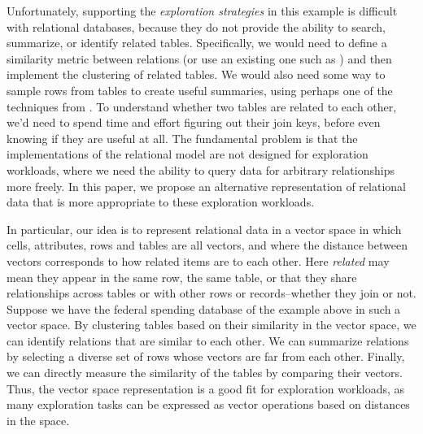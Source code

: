 Unfortunately, supporting the \emph{exploration strategies} in this example is
difficult with relational databases, because they do not provide the ability to
search, summarize, or identify related tables. Specifically, we would need to
define a similarity metric between relations (or use an existing one such as
\cite{summarydb}) and then implement the clustering of related tables. We would also
need some way to sample rows from tables to create useful summaries, using
perhaps one of the techniques from \cite{diversifydb}. To understand whether two
tables are related to each other, we'd need to spend time and effort figuring
out their join keys, before even knowing if they are useful at all. The
fundamental problem is that the implementations of the relational model are not
designed for exploration workloads, where we need the ability to query data for
arbitrary relationships more freely. In this paper, we propose an alternative
representation of relational data that is more appropriate to these exploration
workloads.

In particular, our idea is to represent relational data in a vector space in
which cells, attributes, rows and tables are all vectors, and where the distance
between vectors corresponds to how related items are to each other. Here {\it
related} may mean they appear in the same row, the same table, or that they
share relationships across tables or with other rows or records--whether they
join or not. Suppose we have the federal spending database of the example above
in such a vector space. By clustering tables based on their similarity in the
vector space, we can identify relations that are similar to each other. We can
summarize relations by selecting a diverse set of rows whose vectors are far
from each other. Finally, we can directly measure the similarity of the tables
by comparing their vectors. Thus, the vector space representation is a good fit
for exploration workloads, as many exploration tasks can be expressed as vector
operations based on distances in the space.

